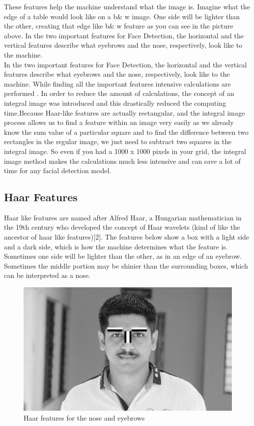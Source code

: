 \documentclass[12pt,a4paper]{article}
\begin{document}
These features help the machine understand what the image is. Imagine what the edge of a table would look like on a b\& w image. One side will be lighter than the other, creating that edge like b\& w feature as you can see in the picture above.
In the two important features for Face Detection, the horizontal and the vertical features describe what eyebrows and the nose, respectively, look like to the machine.\\
In the two important features for Face Detection, the horizontal and the vertical features describe what eyebrows and the nose, respectively, look like to the machine. While finding all the important features intensive calculations are performed . In order to reduce the amount of calculations, the concept of an integral image was introduced and this drastically reduced the computing time.Because Haar-like features are actually rectangular, and the integral image process allows us to find a feature within an image very easily as we already know the sum value of a particular square and to find the difference between two rectangles in the regular image, we just need to subtract two squares in the integral image. So even if you had a 1000 x 1000 pixels in your grid, the integral image method makes the calculations much less intensive and can save a lot of time for any facial detection model.
\subsection{Haar Features}
Haar like features are named after Alfred Haar, a Hungarian mathematician in the 19th century who developed the concept of Haar wavelets (kind of like the ancestor of haar like features)[2]. The features below show a box with a light side and a dark side, which is how the machine determines what the feature is. Sometimes one side will be lighter than the other, as in an edge of an eyebrow. Sometimes the middle portion may be shinier than the surrounding boxes, which can be interpreted as a nose.
\\
\begin{figure}[h!]
\centerline{\includegraphics[scale=0.5]{haar_nose.jpg}}
\caption{Haar features for the nose and eyebrows}
\label{fig 2}
\end{figure}
\\
\end{document}

